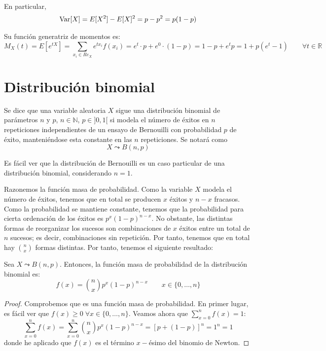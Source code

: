 En particular,
\begin{equation*}
    \operatorname{Var}[X] = E[X^2] - E[X]^2 = p-p^2 = p(1-p)
\end{equation*}

Su función generatriz de momentos es:
\begin{equation*}
    M_X(t) = E[e^{tX}] = \sum_{x_i\in Re_X}e^{tx_i}f(x_i) = e^t\cdot p + e^0\cdot (1-p) = 1-p +e^tp = 1+p(e^t-1)     
    \qquad \forall t\in \mathbb{R}
\end{equation*}

\section{Distribución binomial}
\begin{definicion}
    Se dice que una variable aleatoria $X$ sigue una distribución binomial de parámetros $n$ y $p$, $n\in \mathbb{N}$, $p\in ]0,1[$ si modela el número de éxitos en $n$ repeticiones independientes de un ensayo de Bernouilli con probabilidad $p$ de éxito, manteniéndose esta constante en las $n$ repeticiones. Se notará como $$X\leadsto B(n,p)$$
\end{definicion}

\begin{observacion}
    Es fácil ver que la distribución de Bernouilli es un caso particular de una distribución binomial, considerando $n=1$.
\end{observacion}

Razonemos la función masa de probabilidad. Como la variable $X$ modela el número de éxitos, tenemos que en total se producen $x$ éxitos y $n-x$ fracasos. Como la probabilidad se mantiene constante, tenemos que la probabilidad para cierta ordenación de los éxitos es $p^x(1-p)^{n-x}$. No obstante, las distintas formas de reorganizar los sucesos son combinaciones de $x$ éxitos entre un total de $n$ sucesos; es decir, combinaciones sin repetición. Por tanto, tenemos que en total hay $\binom{n}{x}$ formas distintas. Por tanto, tenemos el siguiente resultado:
\begin{prop}
    Sea $X\leadsto B(n,p)$. Entonces, la función masa de probabilidad de la distribución binomial es:
    \begin{equation*}
        f(x) = \binom{n}{x}p^x (1-p)^{n-x} \qquad x\in \{0,\dots,n\}
    \end{equation*}
\end{prop}
\begin{proof}
    Comprobemos que es una función masa de probabilidad. En primer lugar, es fácil ver que $f(x)\geq 0\;\forall x\in \{0,\dots,n\}$. Veamos ahora que $\sum\limits_{x=0}^n f(x)=1$:
    \begin{equation*}
        \sum_{x=0}^n f(x)
        = \sum_{x=0}^n \binom{n}{x}p^x (1-p)^{n-x}
        = [p + (1-p)]^n = 1^n = 1
    \end{equation*}
    donde he aplicado que $f(x)$ es el término $x-$ésimo del binomio de Newton.
\end{proof}

